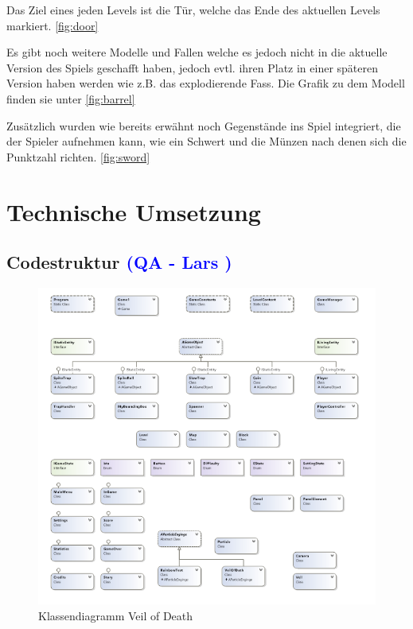 \documentclass[12pt]{article}
\begin{document}
Das Ziel eines jeden Levels ist die Tür, welche das Ende des aktuellen Levels markiert. \ref{fig:door}\newline

Es gibt noch weitere Modelle und Fallen welche es jedoch nicht in die aktuelle Version des Spiels geschafft haben, jedoch evtl. ihren Platz in einer späteren Version haben werden wie z.B. das
explodierende Fass. Die Grafik zu dem Modell finden sie unter \ref{fig:barrel}\newline

Zusätzlich wurden wie bereits erwähnt noch Gegenstände ins Spiel integriert, die der Spieler aufnehmen kann, wie ein Schwert und die Münzen nach denen sich die Punktzahl richten. \ref{fig:sword}\newline

\newpage
\section{Technische Umsetzung}

\vspace{2cm}
\subsection{Codestruktur \textcolor{blue}{(QA - Lars )}}

\begin{figure}
	\centering
	\includegraphics[width=1\textwidth]{classdiagramm.png}
	\caption{Klassendiagramm Veil of Death
		\label{fig:classdiagramm}}
\end{figure}
\end{document}
